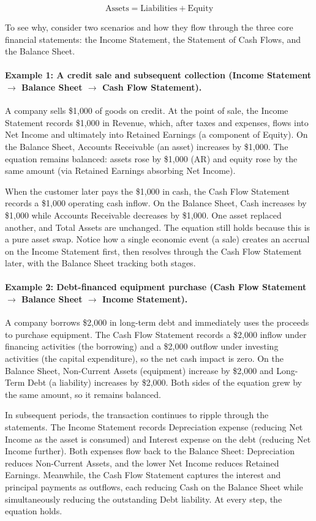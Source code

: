\documentclass[12pt,a4paper]{article}
\begin{document}
\[
\text{Assets} = \text{Liabilities} + \text{Equity}
\]

To see why, consider two scenarios and how they flow through the
three core financial statements: the Income Statement, the Statement
of Cash Flows, and the Balance Sheet.

\paragraph{Example 1: A credit sale and subsequent collection
(Income Statement $\to$ Balance Sheet $\to$ Cash Flow Statement).}
A company sells \$1{,}000 of goods on credit. At the point of sale,
the Income Statement records \$1{,}000 in Revenue, which, after
taxes and expenses, flows into Net Income and ultimately into
Retained Earnings (a component of Equity). On the Balance Sheet,
Accounts Receivable (an asset) increases by \$1{,}000. The equation
remains balanced: assets rose by \$1{,}000 (AR) and equity rose by
the same amount (via Retained Earnings absorbing Net Income).

When the customer later pays the \$1{,}000 in cash, the Cash Flow
Statement records a \$1{,}000 operating cash inflow. On the Balance
Sheet, Cash increases by \$1{,}000 while Accounts Receivable
decreases by \$1{,}000. One asset replaced another, and Total Assets
are unchanged. The equation still holds because this is a pure asset
swap. Notice how a single economic event (a sale) creates an accrual
on the Income Statement first, then resolves through the Cash Flow
Statement later, with the Balance Sheet tracking both stages.

\paragraph{Example 2: Debt-financed equipment purchase
(Cash Flow Statement $\to$ Balance Sheet $\to$ Income Statement).}
A company borrows \$2{,}000 in long-term debt and immediately uses
the proceeds to purchase equipment. The Cash Flow Statement records a
\$2{,}000 inflow under financing activities (the borrowing) and a
\$2{,}000 outflow under investing activities (the capital
expenditure), so the net cash impact is zero. On the Balance Sheet,
Non-Current Assets (equipment) increase by \$2{,}000 and Long-Term
Debt (a liability) increases by \$2{,}000. Both sides of the equation
grew by the same amount, so it remains balanced.

In subsequent periods, the transaction continues to ripple through the
statements. The Income Statement records Depreciation expense (reducing
Net Income as the asset is consumed) and Interest expense on the debt
(reducing Net Income further). Both expenses flow back to the Balance
Sheet: Depreciation reduces Non-Current Assets, and the lower Net
Income reduces Retained Earnings. Meanwhile, the Cash Flow Statement
captures the interest and principal payments as outflows, each
reducing Cash on the Balance Sheet while simultaneously reducing the
outstanding Debt liability. At every step, the equation holds.
\end{document}
